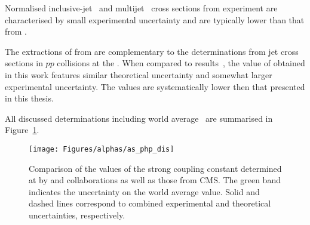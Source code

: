 Normalised inclusive-jet~\cite{epj:c65:363} and multijet~\cite{epj:c75:65} cross sections from \hone experiment are characterised by small experimental uncertainty and are typically lower than that from \zeus. %

The extractions of \asz from \hera are complementary to the determinations from jet cross sections in $pp$ collisions at the \lhc. When compared to \cms results~\cite{Chatrchyan:2012bja,Chatrchyan:2013txa,CMS:2014mna}, the value of \asz obtained in this work features similar theoretical uncertainty and somewhat larger experimental uncertainty. The \cms values are systematically lower then that presented in this thesis.

All discussed determinations including world average~\cite{PDG:2014} are summarised in Figure~\ref{fig:as_php_dis}.
\begin{figure}[htpb]
	\centering
		\texttt{[image: Figures/alphas/as\_php\_dis]}
	\caption{Comparison of the values of the strong coupling constant determined at \hera by \hone and \zeus collaborations as well as those from CMS. The green band indicates the uncertainty on the world average \as value. Solid and dashed lines correspond to combined experimental and theoretical uncertainties, respectively.}
	\label{fig:as_php_dis}
\end{figure}
